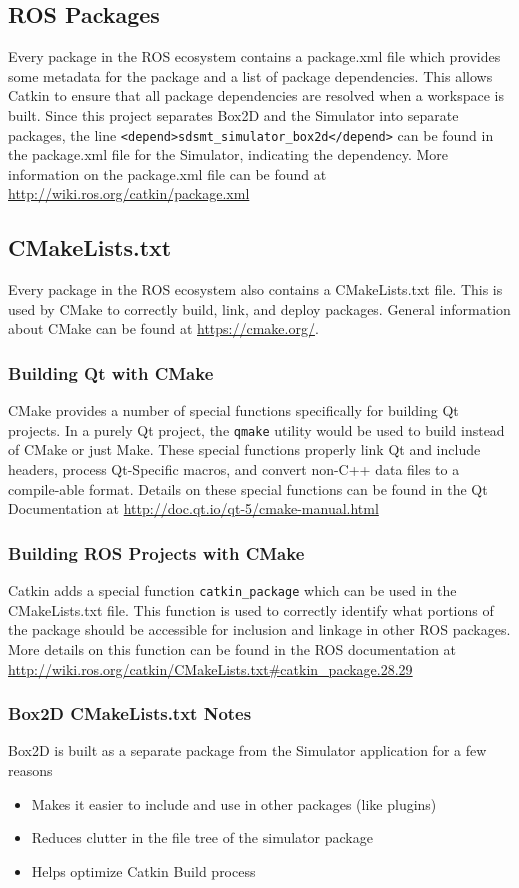 \subsection{ROS Packages}
Every package in the ROS ecosystem contains a package.xml file which provides some metadata for the package and a list of package dependencies. This allows Catkin to ensure that all package dependencies are resolved when a workspace is built. Since this project separates Box2D and the Simulator into separate packages, the line \lstinline|<depend>sdsmt_simulator_box2d</depend>| can be found in the package.xml file for the Simulator, indicating the dependency.  More information on the package.xml file can be found at \url{http://wiki.ros.org/catkin/package.xml}

\subsection{CMakeLists.txt}
Every package in the ROS ecosystem also contains a CMakeLists.txt file. This is used by CMake to correctly build, link, and deploy packages. General information about CMake can be found at \url{https://cmake.org/}.

\subsubsection*{Building Qt with CMake}
CMake provides a number of special functions specifically for building Qt projects. In a purely Qt project, the \lstinline|qmake| utility would be used to build instead of CMake or just Make. These special functions properly link Qt and include headers, process Qt-Specific macros, and convert non-C++ data files to a compile-able format. Details on these special functions can be found in the Qt Documentation at \url{http://doc.qt.io/qt-5/cmake-manual.html}

\subsubsection*{Building ROS Projects with CMake}
Catkin adds a special function \lstinline|catkin_package| which can be used in the CMakeLists.txt file. This function is used to correctly identify what portions of the package should be accessible for inclusion and linkage in other ROS packages. More details on this function can be found in the ROS documentation at \url{http://wiki.ros.org/catkin/CMakeLists.txt#catkin_package.28.29}
\subsubsection*{Box2D CMakeLists.txt Notes}
Box2D is built as a separate package from the Simulator application for a few reasons
\begin{itemize}
	\item Makes it easier to include and use in other packages (like plugins)
	\item Reduces clutter in the file tree of the simulator package
	\item Helps optimize Catkin Build process
\end{itemize}

